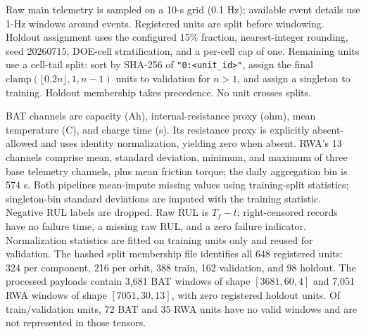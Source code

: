 \documentclass[journal]{IEEEtran}
\begin{document}
Raw main telemetry is sampled on a 10-s grid (0.1 Hz); available event details use 1-Hz windows around events. Registered units are split before windowing. Holdout assignment uses the configured 15\% fraction, nearest-integer rounding, seed 20260715, DOE-cell stratification, and a per-cell cap of one. Remaining units use a cell-tail split: sort by SHA-256 of \texttt{"0:<unit\_id>"}, assign the final $\mathrm{clamp}(\lfloor0.2n\rfloor,1,n-1)$ units to validation for $n>1$, and assign a singleton to training. Holdout membership takes precedence. No unit crosses splits.

\begin{table}[t]
\centering
\caption{Registered source data and unit split counts. Window counts refer to processed train/validation tensors; registered holdout units are absent from these tensors.}
\label{tab:data}
\scriptsize
{}%
\end{table}

BAT channels are capacity (Ah), internal-resistance proxy (ohm), mean temperature (C), and charge time (s). Its resistance proxy is explicitly absent-allowed and uses identity normalization, yielding zero when absent. RWA's 13 channels comprise mean, standard deviation, minimum, and maximum of three base telemetry channels, plus mean friction torque; the daily aggregation bin is 574 s. Both pipelines mean-impute missing values using training-split statistics; singleton-bin standard deviations are imputed with the training statistic. Negative RUL labels are dropped. Raw RUL is $T_f-t$; right-censored records have no failure time, a missing raw RUL, and a zero failure indicator. Normalization statistics are fitted on training units only and reused for validation. The hashed split membership file identifies all 648 registered units: 324 per component, 216 per orbit, 388 train, 162 validation, and 98 holdout. The processed payloads contain 3,681 BAT windows of shape $[3681,60,4]$ and 7,051 RWA windows of shape $[7051,30,13]$, with zero registered holdout units. Of train/validation units, 72 BAT and 35 RWA units have no valid windows and are not represented in those tensors.
\end{document}

